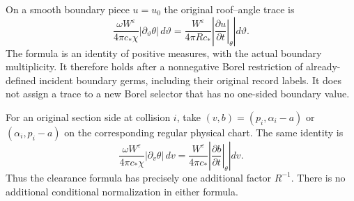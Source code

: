 \begin{theorem}
\label{thm:bf-flux}
On a smooth boundary piece $u=u_0$ the original roof--angle trace is
\begin{equation}\label{eq:bf-flux}
 \frac{\omega W^\varepsilon}{4\pi c_*\chi}
       |\partial_\vartheta\theta|\,d\vartheta
   =\frac{W^\varepsilon}{4\pi R c_*}
       \left|\left.\frac{\partial u}{\partial t}\right|_\theta\right|
          d\vartheta .
\end{equation}
The formula is an identity of positive measures, with the actual
boundary multiplicity.  It therefore holds after a nonnegative Borel
restriction of already-defined incident boundary germs, including
their original record labels.  It does not assign a trace to a new
Borel selector that has no one-sided boundary value.

For an original section side at collision $i$, take
$(v,b)=(p_i,\alpha_i-a)$ or $(\alpha_i,p_i-a)$ on the corresponding
regular physical chart.  The same identity is
\begin{equation}\label{eq:bf-section-flux}
 \frac{\omega W^\varepsilon}{4\pi c_*\chi}
       |\partial_v\theta|\,dv
   =\frac{W^\varepsilon}{4\pi c_*}
       \left|\left.\frac{\partial b}{\partial t}\right|_\theta\right|
          dv .
\end{equation}
Thus the clearance formula has precisely one additional factor $R^{-1}$.
There is no additional conditional normalization in either formula.
\end{theorem}
